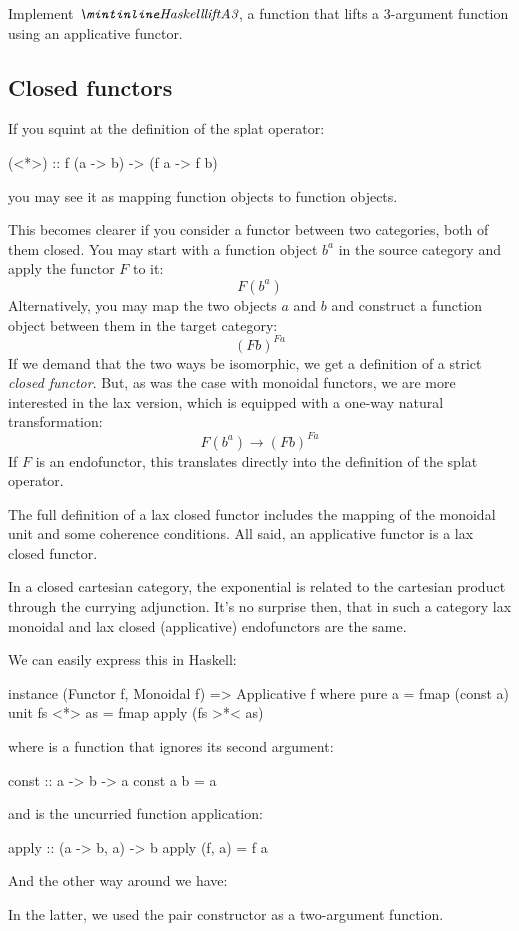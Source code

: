 \documentclass[DaoFP]{subfiles}
\begin{document}
\begin{exercise}
Implement $\emph{\hask{liftA3}}$, a function that lifts a 3-argument function using an applicative functor.
\end{exercise}

\subsection{Closed functors}
If you squint at the definition of the splat operator:
\begin{haskell}
(<*>) :: f (a -> b) -> (f a -> f b)
\end{haskell}
you may see it as mapping function objects to function objects. 

This becomes clearer if you consider a functor between two categories, both of them closed. You may start with a function object $b^a$ in the source category and apply the functor $F$ to it:
\[ F (b^a) \]
Alternatively, you may map the two objects $a$ and $b$ and construct a function object between them in the target category:
\[ (F b)^{F a} \]
If we demand that the two ways be isomorphic, we get a definition of a strict \emph{closed functor}. But, as was the case with monoidal functors, we are more interested in the lax version, which is equipped with a one-way natural transformation:
\[ F (b^a) \to (F b)^{F a} \]
If $F$ is an endofunctor, this translates directly into the definition of the splat operator. 

The full definition of a lax closed functor includes the mapping of the monoidal unit and some coherence conditions. All said, an applicative functor is a lax closed functor.

In a closed cartesian category, the exponential is related to the cartesian product through the currying adjunction. It's no surprise then, that in such a category lax monoidal and lax closed (applicative) endofunctors are the same. 

We can easily express this in Haskell:
\begin{haskell}
instance (Functor f, Monoidal f) => Applicative f where
  pure a = fmap (const a) unit
  fs <*> as = fmap apply (fs >*< as)
\end{haskell}
where  is a function that ignores its second argument:
\begin{haskell}
const :: a -> b -> a
const a b = a
\end{haskell}
and  is the uncurried function application:
\begin{haskell}
apply :: (a -> b, a) -> b
apply (f, a) = f a
\end{haskell}
And the other way around we have:
In the latter, we used the pair constructor \hask{(,)} as a two-argument function.
\end{document}
